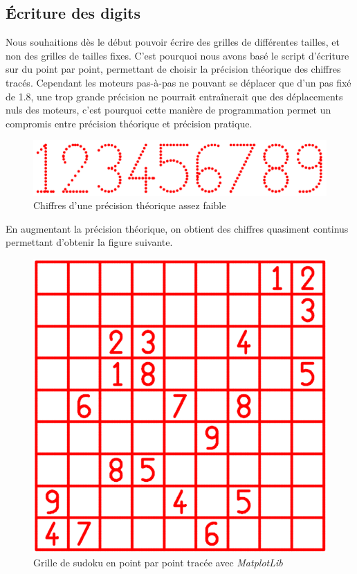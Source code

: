 \documentclass[12pt,a4paper]{report}
\begin{document}
\subsection*{Écriture des digits}
Nous souhaitions dès le début pouvoir écrire des grilles de différentes tailles, et non des grilles de tailles fixes. C'est pourquoi nous avons basé le script d'écriture sur du point par point, permettant de choisir la précision théorique des chiffres tracés. Cependant les moteurs pas-à-pas ne pouvant se déplacer que d'un pas fixé de 1.8\degre, une trop grande précision ne pourrait entraînerait que des déplacements nuls des moteurs, c'est pourquoi cette manière de programmation permet un compromis entre précision théorique et précision pratique.
\begin{figure}[!h]
 \center
 \includegraphics[scale=0.35]{../pictures/numbers}
 \caption{Chiffres d'une précision théorique assez faible}
\end{figure}

En augmentant la précision théorique, on obtient des chiffres quasiment continus permettant d'obtenir la figure suivante.

\begin{figure}[!h]
 \center
 \includegraphics[scale=0.5]{../pictures/Sudoku_points}
 \caption{Grille de sudoku en point par point tracée avec \emph{MatplotLib}}
\end{figure}
\end{document}
